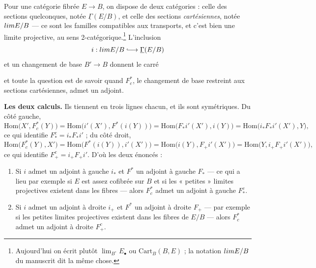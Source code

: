\documentclass[11pt,a4paper]{article}
\begin{document}
Pour une catégorie fibrée $E \to B$, on dispose de deux catégories : celle des
sections quelconques, notée $\underline{\Gamma}(E/B)$, et celle des sections
\emph{cartésiennes}, notée $\varprojlim E/B$ — ce sont les familles
compatibles aux transports, et c'est bien une limite projective, au sens
2-catégorique.\footnote{Aujourd'hui on écrit plutôt
$\lim_{B^{\circ}} E_{\bullet}$ ou $\mathrm{Cart}_{B}(B, E)$ ; la notation
$\varprojlim E/B$ du manuscrit dit la même chose.} L'inclusion
\[
  i : \varprojlim E/B \lhook\joinrel\longrightarrow \underline{\Gamma}(E/B)
\]
et un changement de base $B' \to B$ donnent le carré


et toute la question est de savoir quand $F^{*}_{c}$, le changement de base
restreint aux sections cartésiennes, admet un adjoint.


\textbf{Les deux calculs.} Ils tiennent en trois lignes chacun, et ils sont
symétriques. Du côté gauche,
\[
  \mathrm{Hom}\bigl( X', F^{*}_{c}(Y) \bigr)
  = \mathrm{Hom}\bigl( i'(X'), F^{*}(i(Y)) \bigr)
  = \mathrm{Hom}\bigl( F_{*} i'(X'), i(Y) \bigr)
  = \mathrm{Hom}\bigl( i_{*} F_{*} i'(X'), Y \bigr) ,
\]
ce qui identifie $F^{c}_{*} = i_{*} F_{*} i'$ ; du côté droit,
\[
  \mathrm{Hom}\bigl( F^{*}_{c}(Y), X' \bigr)
  = \mathrm{Hom}\bigl( F^{*}(i(Y)), i'(X') \bigr)
  = \mathrm{Hom}\bigl( i(Y), F_{+} i'(X') \bigr)
  = \mathrm{Hom}\bigl( Y, i_{+} F_{+} i'(X') \bigr) ,
\]
ce qui identifie $F^{c}_{+} = i_{+} F_{+} i'$. D'où les deux énoncés :

\begin{enumerate}
\item[\textbf{①}] Si $i$ admet un adjoint à gauche $i_{*}$ et $F^{*}$ un
adjoint à gauche $F_{*}$ — ce qui a lieu par exemple si $E$ est assez cofibrée
sur $B$ et si les « petites » limites projectives existent dans les fibres —
alors $F^{*}_{c}$ admet un adjoint à gauche $F^{c}_{*}$.
\item[\textbf{②}] Si $i$ admet un adjoint à droite $i_{+}$ et $F^{*}$ un
adjoint à droite $F_{+}$ — par exemple si les petites limites projectives
existent dans les fibres de $E/B$ — alors $F^{*}_{c}$ admet un adjoint à droite
$F^{c}_{+}$.
\end{enumerate}
\end{document}
